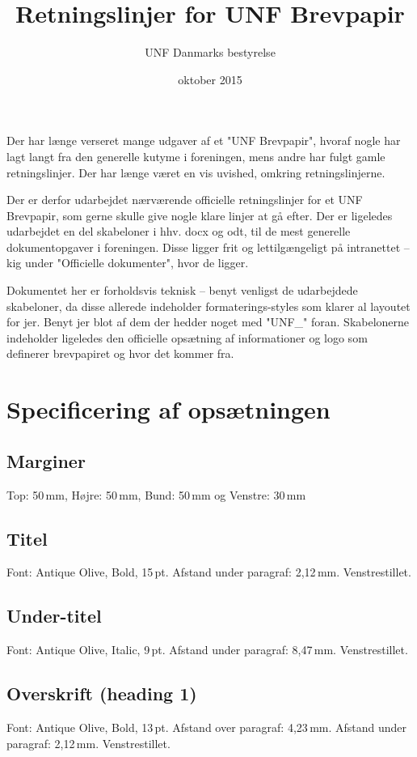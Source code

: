 \documentclass[danmark]{../UNF}
\title{Retningslinjer for UNF Brevpapir}
\author{UNF Danmarks bestyrelse}
\date{oktober 2015}
\begin{document}
\maketitle

Der har længe verseret mange udgaver af et "UNF Brevpapir",
hvoraf nogle har lagt langt fra den generelle kutyme i foreningen,
mens andre har fulgt gamle retningslinjer. Der har længe været en vis uvished,
omkring retningslinjerne.

Der er derfor udarbejdet nærværende officielle retningslinjer for et UNF Brevpapir,
som gerne skulle give nogle klare linjer at gå efter.
Der er ligeledes udarbejdet en del skabeloner i hhv. docx og odt,
til de mest generelle dokumentopgaver i foreningen.
Disse ligger frit og lettilgængeligt på intranettet -- kig under "Officielle dokumenter", 
hvor de ligger.

Dokumentet her er forholdsvis teknisk -- benyt venligst de udarbejdede skabeloner, 
da disse allerede indeholder formaterings-styles som klarer al layoutet for jer.
Benyt jer blot af dem der hedder noget med "UNF\_" foran.
Skabelonerne indeholder ligeledes den officielle opsætning af informationer
og logo som definerer brevpapiret og hvor det kommer fra.

\section{Specificering af opsætningen}

\subsection{Marginer}
Top: 50\,mm, Højre: 50\,mm, Bund: 50\,mm og Venstre: 30\,mm

\subsection{Titel}
Font: Antique Olive, Bold, 15\,pt. Afstand under paragraf: 2,12\,mm. Venstrestillet.

\subsection{Under-titel}
Font: Antique Olive, Italic, 9\,pt. Afstand under paragraf: 8,47\,mm. Venstrestillet.

\subsection{Overskrift (heading 1)}
Font: Antique Olive, Bold, 13\,pt. Afstand over paragraf: 4,23\,mm. Afstand under paragraf: 2,12\,mm. Venstrestillet.
\end{document}
